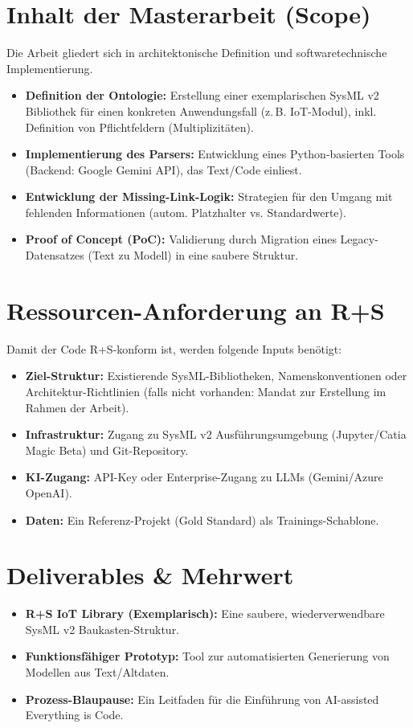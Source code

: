 \documentclass[a4paper,10pt]{article}
\begin{document}
\section{Inhalt der Masterarbeit (Scope)}
Die Arbeit gliedert sich in architektonische Definition und softwaretechnische Implementierung.
\begin{itemize}
    \item \textbf{Definition der Ontologie:} Erstellung einer exemplarischen SysML v2 Bibliothek für einen konkreten Anwendungsfall (z.\,B. IoT-Modul), inkl. Definition von Pflichtfeldern (Multiplizitäten).
    \item \textbf{Implementierung des Parsers:} Entwicklung eines Python-basierten Tools (Backend: Google Gemini API), das Text/Code einliest.
    \item \textbf{Entwicklung der \glqq Missing-Link-Logik\grqq:} Strategien für den Umgang mit fehlenden Informationen (autom. Platzhalter vs. Standardwerte).
    \item \textbf{Proof of Concept (PoC):} Validierung durch Migration eines \glqq Legacy-Datensatzes\grqq{} (Text zu Modell) in eine saubere Struktur.
\end{itemize}

\section{Ressourcen-Anforderung an R+S}
Damit der \glqq Code\grqq{} R+S-konform ist, werden folgende Inputs benötigt:
\begin{itemize}
    \item \textbf{Ziel-Struktur:} Existierende SysML-Bibliotheken, Namenskonventionen oder Architektur-Richtlinien (falls nicht vorhanden: Mandat zur Erstellung im Rahmen der Arbeit).
    \item \textbf{Infrastruktur:} Zugang zu SysML v2 Ausführungsumgebung (Jupyter/Catia Magic Beta) und Git-Repository.
    \item \textbf{KI-Zugang:} API-Key oder Enterprise-Zugang zu LLMs (Gemini/Azure OpenAI).
    \item \textbf{Daten:} Ein Referenz-Projekt (\glqq Gold Standard\grqq) als Trainings-Schablone.
\end{itemize}

\section{Deliverables \& Mehrwert}
\begin{itemize}
    \item \textbf{R+S IoT Library (Exemplarisch):} Eine saubere, wiederverwendbare SysML v2 Baukasten-Struktur.
    \item \textbf{Funktionsfähiger Prototyp:} Tool zur automatisierten Generierung von Modellen aus Text/Altdaten.
    \item \textbf{Prozess-Blaupause:} Ein Leitfaden für die Einführung von \glqq AI-assisted Everything is Code\grqq.
\end{itemize}
\end{document}
